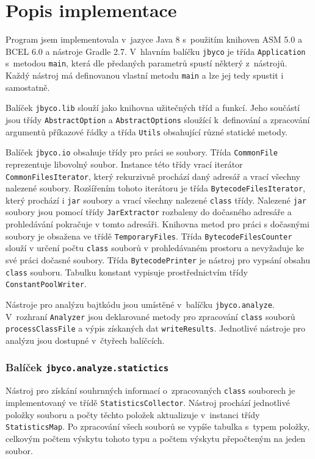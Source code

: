 \section{Popis implementace}\label{ToolImplementation}

Program jsem implementovala v~jazyce Java 8 s~použitím knihoven ASM 5.0 a BCEL 6.0 a nástroje Gradle 2.7. V~hlavním balíčku \texttt{jbyco} je třída \texttt{Application} s~metodou \texttt{main}, která dle předaných parametrů spustí některý z~nástrojů. Každý nástroj má definovanou vlastní metodu \texttt{main} a lze jej tedy spustit i samostatně.

Balíček \texttt{jbyco.lib} slouží jako knihovna užitečných tříd a funkcí. Jeho součástí jsou třídy \texttt{AbstractOption} a \texttt{AbstractOptions} sloužící k~definování a zpracování argumentů příkazové řádky a třída \texttt{Utils} obsahující různé statické metody. 

Balíček \texttt{jbyco.io} obsahuje třídy pro práci se soubory. Třída \texttt{CommonFile} reprezentuje libovolný soubor. Instance této třídy vrací iterátor \texttt{CommonFilesIterator}, který rekurzivně prochází daný adresář a vrací všechny nalezené soubory. Rozšířením tohoto iterátoru je třída \texttt{BytecodeFilesIterator}, který prochází i \texttt{jar} soubory a vrací všechny nalezené \texttt{class} třídy. Nalezené \texttt{jar} soubory jsou pomocí třídy \texttt{JarExtractor} rozbaleny do dočasného adresáře a prohledávání pokračuje v tomto adresáři. Knihovna metod pro práci s dočasnými soubory je obsažena ve třídě \texttt{TemporaryFiles}. Třída \texttt{BytecodeFilesCounter} slouží v určení počtu \texttt{class} souborů v prohledávaném prostoru a nevyžaduje ke své práci dočasné soubory. 
Třída \texttt{BytecodePrinter} je nástroj pro vypsání obsahu \texttt{class} souboru. Tabulku konstant vypisuje prostřednictvím třídy \texttt{ConstantPoolWriter}.  

Nástroje pro analýzu bajtkódu jsou umístěné v~balíčku \texttt{jbyco.analyze}. V~rozhraní \texttt{Analyzer} jsou deklarované metody pro zpracování \texttt{class} souborů \texttt{processClassFile} a výpis získaných dat \texttt{writeResults}. Jednotlivé nástroje pro analýzu jsou dostupné v~čtyřech balíčcích.

\subsubsection{Balíček \texttt{jbyco.analyze.statictics}}

Nástroj pro získání souhrnných informací o~zpracovaných \texttt{class} souborech je implementovaný ve třídě \texttt{StatisticsCollector}. Nástroj prochází jednotlivé položky souboru a  počty těchto položek aktualizuje v~instanci třídy \texttt{StatisticsMap}. Po zpracování všech souborů se vypíše tabulka s~typem položky, celkovým počtem výskytu tohoto typu a počtem výskytu přepočteným na jeden soubor. 

